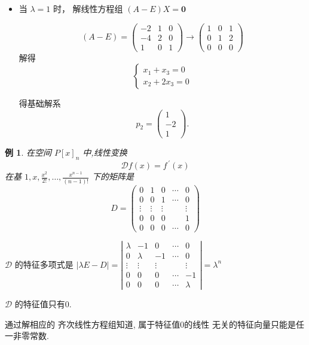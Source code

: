 \documentclass[13pt]{beamer}
\newtheorem{exa}{例}
\begin{document}
\begin{frame}
\begin{itemize}
	\item 
当 $\lambda=1$ 时， 解线性方程组 $(A-E) X=\mathbf{0}$

\[
(A-E)=\left(\begin{array}{ccc}-2 & 1 & 0 \\ -4 & 2 & 0 \\ 1 & 0 & 1\end{array}\right) \rightarrow\left(\begin{array}{lll}1 & 0 & 1 \\ 0 & 1 & 2 \\ 0 & 0 & 0\end{array}\right)
\]
解得
\[
\left\{\begin{array}{l}x_{1}+x_{3}=0 \\ x_{2}+2 x_{3}=0\end{array}\right.
\]

得基础解系 
\[
p_{2}=\left(\begin{array}{c}1 \\ -2 \\ 1\end{array}\right).
\]
\end{itemize}


\end{frame}


\begin{frame}
\begin{exa}
在空间 $P[x]_n$ 中,线性变换
\[
\mathscr{D} f(x)=f^{\,\prime}(x)
\]
在基 $1, x, \frac{x^{2}}{2 !}, \ldots, \frac{x^{n-1}}{(n-1) !}$ 下的矩阵是
\[
{D}=\left(\begin{array}{ccccc}
0 & 1 & 0 & \cdots & 0 \\
0 & 0 & 1 & \cdots & 0 \\
\vdots & \vdots & \vdots & & \vdots \\
0 & 0 & 0 & & 1 \\
0 & 0 & 0 & \cdots & 0
\end{array}\right)
\]
\end{exa}
\end{frame}

\begin{frame}
$\mathscr{D}$ 的特征多项式是 $|\lambda E-D|=\left|\begin{array}{ccccc}\lambda & -1 & 0 & \cdots & 0 \\ 0 & \lambda & -1 & \cdots & 0 \\ \vdots & \vdots & \vdots & & \vdots \\ 0 & 0 & 0 & \cdots & -1 \\ 0 & 0 & 0 & \cdots & \lambda\end{array}\right|=\lambda^{n}$

$\mathscr{D}$ 的特征值只有0. 

通过解相应的
齐次线性方程组知道, 属于特征值0的线性
无关的特征向量只能是任一非零常数. 

\end{frame}
\end{document}

